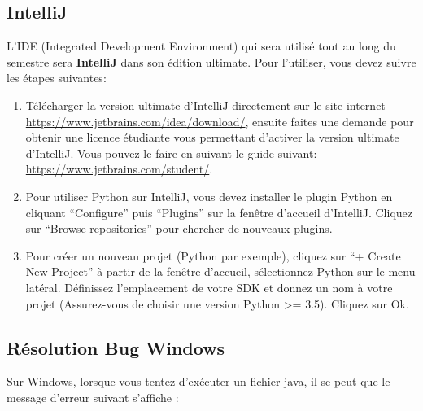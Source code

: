 \subsection*{IntelliJ}

L'IDE (Integrated Development Environment) qui sera utilisé tout au long du semestre sera \textbf{IntelliJ} dans son édition ultimate. Pour l'utiliser, vous devez suivre les étapes suivantes:
\begin{enumerate}
    \item Télécharger la version ultimate d'IntelliJ directement sur le site internet \url{https://www.jetbrains.com/idea/download/}, ensuite faites une demande pour obtenir une licence étudiante vous permettant d'activer la version ultimate d'IntelliJ. Vous pouvez le faire en suivant le guide suivant: \url{https://www.jetbrains.com/student/}.
    \item Pour utiliser Python sur IntelliJ, vous devez installer le plugin Python en cliquant ``Configure'' puis ``Plugins'' sur la fenêtre d'accueil d'IntelliJ. Cliquez sur ``Browse repositories'' pour chercher de nouveaux plugins.
    \item Pour créer un nouveau projet (Python par exemple), cliquez sur ``+ Create New Project'' à partir de la fenêtre d'accueil, sélectionnez Python sur le menu latéral. Définissez l'emplacement de votre SDK et donnez un nom à votre projet (Assurez-vous de choisir une version Python >= 3.5). Cliquez sur Ok.
\end{enumerate}

\subsection*{Résolution Bug Windows}

Sur Windows, lorsque vous tentez d'exécuter un fichier java, il se peut que le message d'erreur suivant s'affiche :\\

